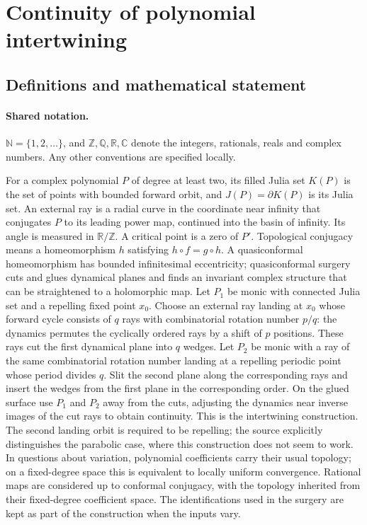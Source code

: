\documentclass[11pt]{article}
\begin{document}
\section{Continuity of polynomial intertwining}\label{statement}

\subsection{Definitions and mathematical statement}

\paragraph{Shared notation.}$\mathbb N=\{1,2,\ldots\}$, and $\mathbb Z,\mathbb Q,\mathbb R,\mathbb C$ denote the integers, rationals, reals and complex numbers. Any other conventions are specified locally.


For a complex polynomial $P$ of degree at least two, its filled Julia set $K(P)$ is the set of points with bounded forward orbit, and $J(P)=\partial K(P)$ is its Julia set. An external ray is a radial curve in the coordinate near infinity that conjugates $P$ to its leading power map, continued into the basin of infinity. Its angle is measured in $\mathbb R/\mathbb Z$. A critical point is a zero of $P'$. Topological conjugacy means a homeomorphism $h$ satisfying $h\circ f=g\circ h$. A quasiconformal homeomorphism has bounded infinitesimal eccentricity; quasiconformal surgery cuts and glues dynamical planes and finds an invariant complex structure that can be straightened to a holomorphic map.
Let $P_1$ be monic with connected Julia set and a repelling fixed point $x_0$. Choose an external ray landing at $x_0$ whose forward cycle consists of $q$ rays with combinatorial rotation number $p/q$: the dynamics permutes the cyclically ordered rays by a shift of $p$ positions. These rays cut the first dynamical plane into $q$ wedges. Let $P_2$ be monic with a ray of the same combinatorial rotation number landing at a repelling periodic point whose period divides $q$. Slit the second plane along the corresponding rays and insert the wedges from the first plane in the corresponding order. On the glued surface use $P_1$ and $P_2$ away from the cuts, adjusting the dynamics near inverse images of the cut rays to obtain continuity. This is the intertwining construction. The second landing orbit is required to be repelling; the source explicitly distinguishes the parabolic case, where this construction does not seem to work.
In questions about variation, polynomial coefficients carry their usual topology; on a fixed-degree space this is equivalent to locally uniform convergence. Rational maps are considered up to conformal conjugacy, with the topology inherited from their fixed-degree coefficient space. The identifications used in the surgery are kept as part of the construction when the inputs vary.
\end{document}
